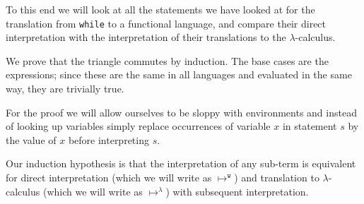 \documentclass[11pt, leqno, titlepage]{article}
\theoremstyle{definition}
\begin{document}
To this end we will look at all the statements we have looked at for the translation
from \texttt{while} to a functional language, and compare their direct interpretation
with the interpretation of their translations to the $\lambda$-calculus. 


We prove that the triangle commutes by induction. The base cases are the expressions;
since these are the same in all languages and evaluated in the same way, they are
trivially true.

For the proof we will allow ourselves to be sloppy with environments and instead of
looking up variables simply replace occurrences of variable $x$ in statement $s$ by
the value of $x$ before interpreting $s$.

Our induction hypothesis is that the interpretation of any sub-term is equivalent for
direct interpretation (which we will write as $\mapsto^{\texttt{w}}$) and translation
to $\lambda$-calculus (which we will write as $\mapsto^\lambda$) with subsequent
interpretation. 
\end{document}

